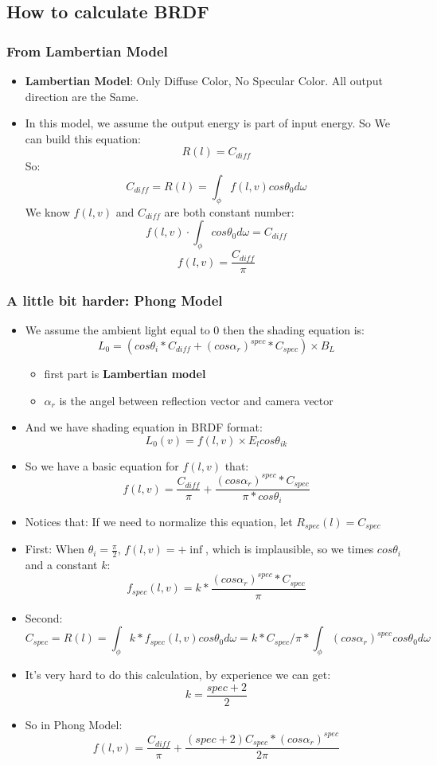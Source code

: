 \documentclass[cyan,normal,en]{elegantnote}
\begin{document}
\subsection{How to calculate BRDF}
\subsubsection{From Lambertian Model}
\begin{itemize}
	\item \textbf{Lambertian Model}: Only Diffuse Color, No Specular Color. All output direction are the Same.
	\item In this model, we assume the output energy is part of input energy. So We can build this equation:
	$$R(l)=C_{diff}$$
	So:
	$$C_{diff}=R(l)=\int_\phi f(l,v) cos\theta_0 d\omega$$
	We know $f(l,v)$ and $C_{diff}$ are both constant number:
	$$f(l,v) \cdot \int_\phi cos\theta_0 d\omega=C_{diff}$$
	$$f(l,v)=\frac{C_{diff}}{\pi}$$
\end{itemize}
\subsubsection{A little bit harder: Phong Model}
\begin{itemize}
	\item We assume the ambient light equal to 0 then the shading equation is:
	$$L_0=(cos\theta_i * C_{diff} + (cos\alpha_r)^{spec}*C_{spec})\times B_L$$
	\begin{itemize}
		\item first part is \textbf{Lambertian model}
		\item $\alpha_r$ is the angel between reflection vector and camera vector
	\end{itemize}
	\item And we have shading equation in BRDF format:
	$$L_0(v)= f(l,v)\times E_l cos\theta_{ik}$$
	\item So we have a basic equation for $f(l,v)$ that:
	$$f(l,v)=\frac{C_{diff}}{\pi}+\frac{(cos\alpha_r)^{spec}*C_{spec}}{\pi * cos\theta_i}$$
	\item Notices that: If we need to normalize this equation, let $R_{spec}(l) = C_{spec}$
	\item First: When $\theta_i=\frac{\pi}{2}$, $f(l,v)=+\inf$, which is implausible, so we times $cos\theta_i$ and a constant $k$:
	$$f_{spec}(l,v)=k * \frac{(cos\alpha_r)^{spec}*C_{spec}}{\pi}$$
	\item Second:
	$$C_{spec}=R(l)=\int_\phi k*f_{spec}(l,v) cos\theta_0 d\omega=k*C_{spec}/\pi * \int_\phi(cos\alpha_r)^{spec} cos\theta_0d\omega$$
	\item It's very hard to do this calculation, by experience we can get:
	$$k=\frac{spec+2}{2}$$
	\item So in Phong Model:
	$$f(l,v)=\frac{C_{diff}}{\pi} + \frac{(spec+2)C_{spec}*(cos\alpha_r)^{spec}}{2\pi}$$
\end{itemize}
\end{document}
